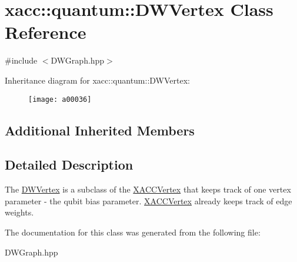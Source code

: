 \hypertarget{a00036}{}\section{xacc\+:\+:quantum\+:\+:D\+W\+Vertex Class Reference}
\label{a00036}


{\ttfamily \#include $<$D\+W\+Graph.\+hpp$>$}

Inheritance diagram for xacc\+:\+:quantum\+:\+:D\+W\+Vertex\+:\begin{figure}[H]
\begin{center}
\leavevmode
\texttt{[image: a00036]}
\end{center}
\end{figure}
\subsection*{Additional Inherited Members}


\subsection{Detailed Description}
The \hyperlink{a00036}{D\+W\+Vertex} is a subclass of the \hyperlink{a00085}{X\+A\+C\+C\+Vertex} that keeps track of one vertex parameter -\/ the qubit bias parameter. \hyperlink{a00085}{X\+A\+C\+C\+Vertex} already keeps track of edge weights. 

The documentation for this class was generated from the following file\+:\begin{DoxyCompactItemize}
\item 
D\+W\+Graph.\+hpp\end{DoxyCompactItemize}

